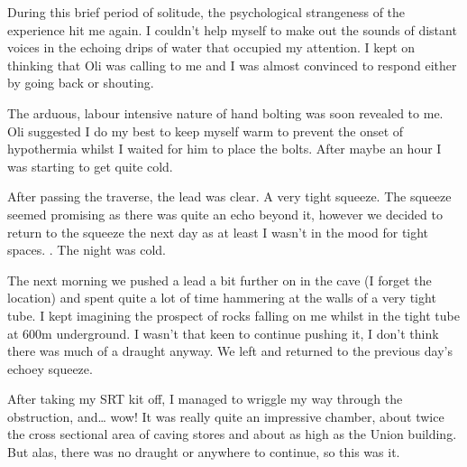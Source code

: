 During this brief period of solitude, the psychological strangeness of the experience hit me again. I couldn't help myself to make out the sounds of distant voices in the echoing drips of water that occupied my attention. I kept on thinking that Oli was calling to me and I was almost convinced to respond either by going back or shouting.

The arduous, labour intensive nature of hand bolting was soon revealed to me. Oli suggested I do my best to keep myself warm to prevent the onset of hypothermia whilst I waited for him to place the bolts. After maybe an hour I was starting to get quite cold. 

After passing the traverse, the lead was clear. A very tight squeeze. The squeeze seemed promising as there was quite an echo beyond it, however we decided to return to the squeeze the next day as at least I wasn’t in the mood for tight spaces. . The night was cold. 

The next morning we pushed a lead a bit further on in the cave (I forget the location)  and spent quite a lot of time hammering at the walls of a very tight tube. I kept imagining the prospect of rocks falling on me whilst in the tight tube at 600m underground. I wasn’t that keen to continue pushing it, I don’t think there was much of a draught anyway. We left and returned to the previous day’s echoey squeeze. 

After taking my SRT kit off, I managed to wriggle my way through the obstruction, and… wow! It was really quite an impressive chamber, about twice the cross sectional area of caving stores and about as high as the Union building. But alas, there was no draught or anywhere to continue, so this was it. 


